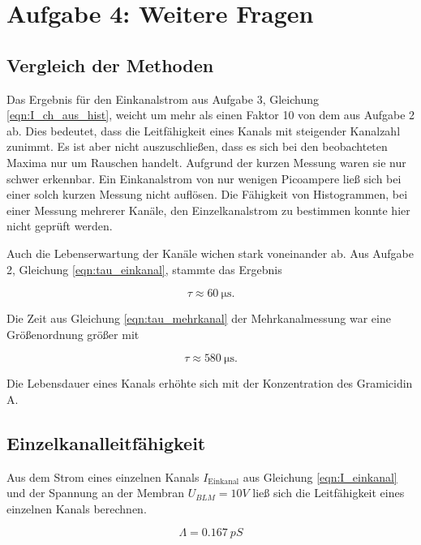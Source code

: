 \documentclass[a4paper,ngerman]{scrartcl}
\begin{document}
\clearpage
\section{Aufgabe 4: Weitere Fragen}

\subsection{Vergleich der Methoden}

Das Ergebnis für den Einkanalstrom aus Aufgabe 3, Gleichung \ref{eqn:I_ch_aus_hist}, weicht um mehr als einen Faktor 10 von dem aus Aufgabe 2 ab. Dies bedeutet, dass die Leitfähigkeit eines Kanals mit steigender Kanalzahl zunimmt. Es ist aber nicht auszuschließen, dass es sich bei den beobachteten Maxima nur um Rauschen handelt. Aufgrund der kurzen Messung waren sie nur schwer erkennbar. Ein Einkanalstrom von nur wenigen Picoampere ließ sich bei einer solch kurzen Messung nicht auflösen. Die Fähigkeit von Histogrammen, bei einer Messung mehrerer Kanäle, den Einzelkanalstrom zu bestimmen konnte hier nicht geprüft werden.

Auch die Lebenserwartung der Kanäle wichen stark voneinander ab. Aus Aufgabe 2, Gleichung \ref{eqn:tau_einkanal}, stammte das Ergebnis

\begin{equation}
\tau \approx \SI{60}{\micro\s}.
\end{equation}

Die Zeit aus Gleichung \ref{eqn:tau_mehrkanal} der Mehrkanalmessung war eine Größenordnung größer mit

\begin{equation}
\tau \approx \SI{580}{\micro\s}.
\end{equation}

Die Lebensdauer eines Kanals erhöhte sich mit der Konzentration des Gramicidin A.

\subsection{Einzelkanalleitfähigkeit}

Aus dem Strom eines einzelnen Kanals $I_{\text{Einkanal}}$ aus Gleichung \ref{eqn:I_einkanal} und der Spannung an der Membran $U_{BLM}= 10 V$ ließ sich die Leitfähigkeit eines einzelnen Kanals berechnen.

\begin{equation}
\label{eqn:Einkanal-leit}
\Lambda = \SI{0.167}{pS}
\end{equation}
\end{document}
